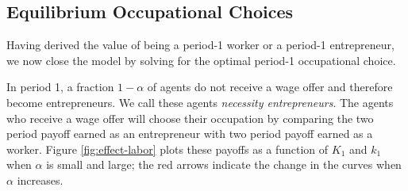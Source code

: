 \documentclass[12pt,american]{paper}
\theoremstyle{remark}
\begin{document}
         




\subsection{Equilibrium Occupational Choices}

Having derived the value of being a period-1 worker or a period-1 entrepreneur, we now close the model by solving for the optimal period-1 occupational choice.

 In period 1, a fraction  $1-\alpha$ of agents do not receive a wage offer and therefore become entrepreneurs. We call these agents \textit{necessity entrepreneurs}. The agents who receive a wage offer will choose their occupation by comparing the two period payoff earned as an entrepreneur with two period payoff earned as a worker. Figure \ref{fig:effect-labor} plots these payoffs as a function of $K_1$ and $k_1$ when $\alpha$ is small and large; the red arrows indicate the change in the curves when $\alpha$ increases.
 
\end{document}
